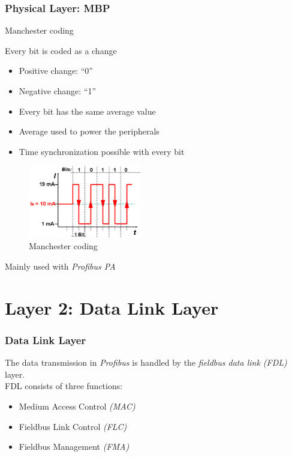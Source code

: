 \documentclass{beamer}
\begin{document}
\begin{frame}
  \frametitle{Physical Layer: MBP}
  Manchester coding \\
  \begin{itemize}
    \begin{multicols}{2}
    \item Every bit is coded as a change
      \begin{itemize}
        \item Positive change: ``0''
        \item Negative change: ``1''
        \item Every bit has the same average value
        \item Average used to power the peripherals
        \item Time synchronization possible with every bit
      \end{itemize}
      \columnbreak
      \begin{figure}[h]
        \centering
        \includegraphics[width=140pt]{img/mbp}
        \caption{Manchester coding}
        \label{fig:mbp}
      \end{figure}
    \end{multicols}
  \end{itemize}
  Mainly used with \textit{Profibus PA}
\end{frame}

\section{Layer 2: Data Link Layer}
\begin{frame}
  \frametitle{Data Link Layer}
  The data transmission in \textit{Profibus} is handled by the \textit{fieldbus data link
    (FDL)} layer. \\
  FDL consists of three functions:
  \begin{itemize}
    \item Medium Access Control \textit{(MAC)}
    \item Fieldbus Link Control \textit{(FLC)}
    \item Fieldbus Management \textit{(FMA)}
  \end{itemize}
\end{frame}
\end{document}
